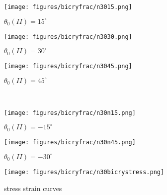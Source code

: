 \documentclass[3p,10pt,sort&compress]{elsarticle}
\begin{document}
%
%
\begin{figure*}[!htb]
	\centering
  \begin{subfigure}{0.32\textwidth}
		\texttt{[image: figures/bicryfrac/n3015.png]}
		\caption{$\theta_0(II) = 15^{\circ}$}
	  \label{fig:theta0II_15}
	\end{subfigure}
	\begin{subfigure}{0.32\textwidth}
    \texttt{[image: figures/bicryfrac/n3030.png]}
		\caption{$\theta_0(II) = 30^{\circ}$}
	  \label{fig:theta0II_30}
	\end{subfigure}
	\begin{subfigure}{0.32\textwidth}
    \texttt{[image: figures/bicryfrac/n3045.png]}
		\caption{$\theta_0(II)= 45^{\circ}$}
	  \label{fig:theta0II_45}
	\end{subfigure}
  \\
  \begin{subfigure}{0.32\textwidth}
    \texttt{[image: figures/bicryfrac/n30n15.png]}
    \caption{$\theta_0(II)= -15^{\circ}$}
    \label{fig:theta0II_n15}
  \end{subfigure}
  \begin{subfigure}{0.32\textwidth}
    \texttt{[image: figures/bicryfrac/n30n45.png]}
    \caption{$\theta_0(II) = -30^{\circ}$}
    \label{fig:theta0II_n45}
  \end{subfigure}
  \begin{subfigure}{0.32\textwidth}
    \texttt{[image: figures/bicryfrac/n30bicrystress.png]}
    \caption{stress strain curves}
    \label{fig:stresscurvesbicrystal}
  \end{subfigure}
	\caption{Final crack paths in the bi-crystals, obtain from the Mode I fracture simulations, where the geometry and boundary conditions are shown in Fig. \ref{fig:bicrystalstructure}. The reference angle of crystal I is set as $\theta_0 = -30^{\circ}$, while crystal II has different reference angles from $-45^{\circ}$ to $45^{\circ}$ with an interval of $15^{\circ}$, except $-30^{\circ}$. The resultant stress-strain curves for these five cases are shown in Fig. \ref{fig:stresscurvesbicrystal}}
  \label{fig:bicryfrac}
\end{figure*}
\end{document}
